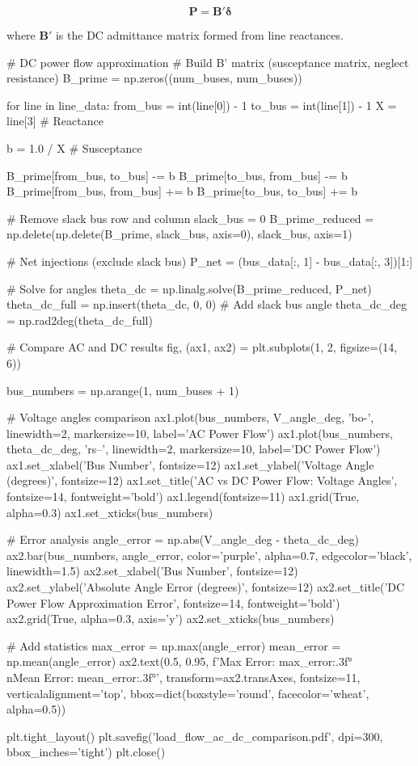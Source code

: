 \documentclass[11pt,a4paper]{article}
\begin{document}
\begin{equation}
\mathbf{P} = \mathbf{B}' \boldsymbol{\delta}
\end{equation}

where $\mathbf{B}'$ is the DC admittance matrix formed from line reactances.

\begin{pycode}
# DC power flow approximation
# Build B' matrix (susceptance matrix, neglect resistance)
B_prime = np.zeros((num_buses, num_buses))

for line in line_data:
    from_bus = int(line[0]) - 1
    to_bus = int(line[1]) - 1
    X = line[3]  # Reactance

    b = 1.0 / X  # Susceptance

    B_prime[from_bus, to_bus] -= b
    B_prime[to_bus, from_bus] -= b
    B_prime[from_bus, from_bus] += b
    B_prime[to_bus, to_bus] += b

# Remove slack bus row and column
slack_bus = 0
B_prime_reduced = np.delete(np.delete(B_prime, slack_bus, axis=0), slack_bus, axis=1)

# Net injections (exclude slack bus)
P_net = (bus_data[:, 1] - bus_data[:, 3])[1:]

# Solve for angles
theta_dc = np.linalg.solve(B_prime_reduced, P_net)
theta_dc_full = np.insert(theta_dc, 0, 0)  # Add slack bus angle
theta_dc_deg = np.rad2deg(theta_dc_full)

# Compare AC and DC results
fig, (ax1, ax2) = plt.subplots(1, 2, figsize=(14, 6))

bus_numbers = np.arange(1, num_buses + 1)

# Voltage angles comparison
ax1.plot(bus_numbers, V_angle_deg, 'bo-', linewidth=2, markersize=10, label='AC Power Flow')
ax1.plot(bus_numbers, theta_dc_deg, 'rs--', linewidth=2, markersize=10, label='DC Power Flow')
ax1.set_xlabel('Bus Number', fontsize=12)
ax1.set_ylabel('Voltage Angle (degrees)', fontsize=12)
ax1.set_title('AC vs DC Power Flow: Voltage Angles', fontsize=14, fontweight='bold')
ax1.legend(fontsize=11)
ax1.grid(True, alpha=0.3)
ax1.set_xticks(bus_numbers)

# Error analysis
angle_error = np.abs(V_angle_deg - theta_dc_deg)
ax2.bar(bus_numbers, angle_error, color='purple', alpha=0.7, edgecolor='black', linewidth=1.5)
ax2.set_xlabel('Bus Number', fontsize=12)
ax2.set_ylabel('Absolute Angle Error (degrees)', fontsize=12)
ax2.set_title('DC Power Flow Approximation Error', fontsize=14, fontweight='bold')
ax2.grid(True, alpha=0.3, axis='y')
ax2.set_xticks(bus_numbers)

# Add statistics
max_error = np.max(angle_error)
mean_error = np.mean(angle_error)
ax2.text(0.5, 0.95, f'Max Error: {max_error:.3f}°\\nMean Error: {mean_error:.3f}°',
         transform=ax2.transAxes, fontsize=11, verticalalignment='top',
         bbox=dict(boxstyle='round', facecolor='wheat', alpha=0.5))

plt.tight_layout()
plt.savefig('load_flow_ac_dc_comparison.pdf', dpi=300, bbox_inches='tight')
plt.close()
\end{pycode}
\end{document}
